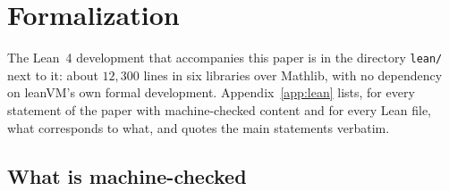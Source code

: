\section{Formalization}\label{sec:formal}

The Lean~4 development that accompanies this paper is in the directory \texttt{lean/} next to it: about $12{,}300$ lines in six libraries over Mathlib, with no dependency on leanVM's own formal development. Appendix~\ref{app:lean} lists, for every statement of the paper with machine-checked content and for every Lean file, what corresponds to what, and quotes the main statements verbatim.

\subsection{What is machine-checked}

